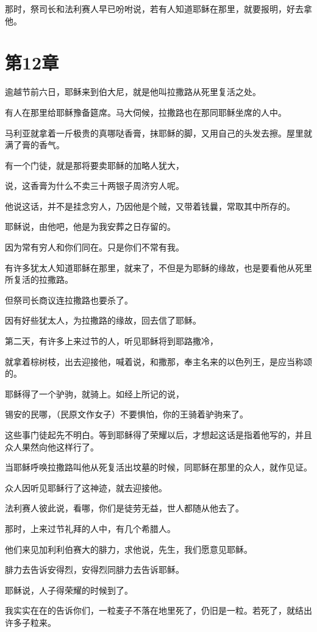 \documentclass[12pt,oneside]{book}
\begin{document}
那时，祭司长和法利赛人早已吩咐说，若有人知道耶稣在那里，就要报明，好去拿他。

\chapter{第12章}
逾越节前六日，耶稣来到伯大尼，就是他叫拉撒路从死里复活之处。

有人在那里给耶稣豫备筵席。马大伺候，拉撒路也在那同耶稣坐席的人中。

马利亚就拿着一斤极贵的真哪哒香膏，抹耶稣的脚，又用自己的头发去擦。屋里就满了膏的香气。

有一个门徒，就是那将要卖耶稣的加略人犹大，

说，这香膏为什么不卖三十两银子周济穷人呢。

他说这话，并不是挂念穷人，乃因他是个贼，又带着钱曩，常取其中所存的。

耶稣说，由他吧，他是为我安葬之日存留的。

因为常有穷人和你们同在。只是你们不常有我。

有许多犹太人知道耶稣在那里，就来了，不但是为耶稣的缘故，也是要看他从死里所复活的拉撒路。

但祭司长商议连拉撒路也要杀了。

因有好些犹太人，为拉撒路的缘故，回去信了耶稣。

第二天，有许多上来过节的人，听见耶稣将到耶路撒冷，

就拿着棕树枝，出去迎接他，喊着说，和撒那，奉主名来的以色列王，是应当称颂的。

耶稣得了一个驴驹，就骑上。如经上所记的说，

锡安的民哪，（民原文作女子）不要惧怕，你的王骑着驴驹来了。

这些事门徒起先不明白。等到耶稣得了荣耀以后，才想起这话是指着他写的，并且众人果然向他这样行了。

当耶稣呼唤拉撒路叫他从死复活出坟墓的时候，同耶稣在那里的众人，就作见证。

众人因听见耶稣行了这神迹，就去迎接他。

法利赛人彼此说，看哪，你们是徒劳无益，世人都随从他去了。

那时，上来过节礼拜的人中，有几个希腊人。

他们来见加利利伯赛大的腓力，求他说，先生，我们愿意见耶稣。

腓力去告诉安得烈，安得烈同腓力去告诉耶稣。

耶稣说，人子得荣耀的时候到了。

我实实在在的告诉你们，一粒麦子不落在地里死了，仍旧是一粒。若死了，就结出许多子粒来。
\end{document}
